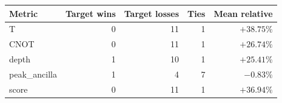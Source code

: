 \begin{tabular}{lrrrr}
\toprule
Metric & Target wins & Target losses & Ties & Mean relative \\
\midrule
T & 0 & 11 & 1 & $+38.75\%$ \\
CNOT & 0 & 11 & 1 & $+26.74\%$ \\
depth & 1 & 10 & 1 & $+25.41\%$ \\
peak_ancilla & 1 & 4 & 7 & $-0.83\%$ \\
score & 0 & 11 & 1 & $+36.94\%$ \\
\bottomrule
\end{tabular}
